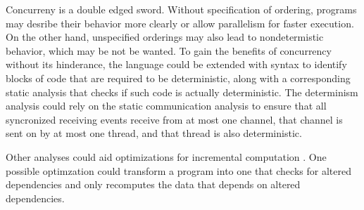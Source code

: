 \documentclass[letterpaper, 11pt]{extarticle}
\begin{document}
Concurreny is a double edged sword. Without specification of ordering, programs may
desribe their behavior more clearly or allow parallelism for faster execution. On the other hand,
unspecified orderings may also lead to nondetermistic behavior, which may be not be wanted. 
To gain the benefits of concurrency without its hinderance, the language could be extended
with syntax to identify blocks of code that are required to be deterministic,
along with a corresponding static analysis that checks if such code is actually
deterministic. The determinism analysis could rely on the static communication analysis
to ensure that all syncronized receiving events receive from at most one channel,
that channel is sent on by at most one thread, and that thread is also deterministic.

Other analyses could aid optimizations for incremental computation
\cite{acar2002adaptive}. One possible optimzation could transform a program into one
that checks for altered dependencies and only recomputes the data that depends on altered dependencies.

\newpage



\end{document}
